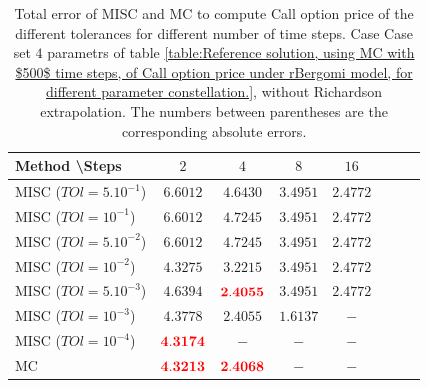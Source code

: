 \documentclass[11pt]{article}
\begin{document}
\begin{table}[h!]
\centering
\begin{tabular}{l*{6}{c}r}
Method \textbackslash  Steps            & $2$ & $4$ & $8$ & $16$  \\
\hline
MISC ($TOl=5.10^{-1}$)  & $\mathbf{6.6012}$ & $\mathbf{ 4.6430}$ & $\mathbf{3.4951}$ & $\mathbf{ 2.4772}$  \\
MISC ($TOl=10^{-1}$)  & $\mathbf{6.6012}$ & $\mathbf{ 4.7245}$& $\mathbf{3.4951}$ & $\mathbf{ 2.4772}$ \\
MISC ($TOl=5.10^{-2}$)  &$\mathbf{6.6012}$& $\mathbf{ 4.7245}$& $\mathbf{3.4951}$ & $\mathbf{ 2.4772}$ \\
MISC ($TOl=10^{-2}$)  & $\mathbf{ 4.3275}$ & $\mathbf{ 3.2215}$ & $\mathbf{3.4951}$ & $\mathbf{ 2.4772}$  \\
MISC ($TOl=5.10^{-3}$)  & $\mathbf{ 4.6394}$ & $\mathbf{{\color{red}2.4055}}$ & $\mathbf{3.4951}$ & $\mathbf{ 2.4772}$  \\

MISC ($TOl=10^{-3}$)  & $\mathbf{ 4.3778}$ & $\mathbf{2.4055}$ & $\mathbf{1.6137}$ & $-$ \\
MISC ($TOl=10^{-4}$)  & $\mathbf{ {\color{red}4.3174}}$ & $-$ &$-$ & $\mathbf{ -}$  \\
\hline
MC     & $\mathbf{ {\color{red}4.3213}}$  & $\mathbf{{\color{red}2.4068}	}$  & $\mathbf{
	-
}$ & $\mathbf{  -	}$  \\			
%		
\hline
\end{tabular}
\caption{Total error of MISC and MC to compute Call option price of the different tolerances for different number of time steps. Case Case set $4$ parametrs of table \ref{table:Reference solution, using MC with $500$ time steps, of Call option price under rBergomi model, for different parameter constellation.}, without Richardson extrapolation. The numbers between parentheses are the corresponding absolute errors.}
\label{Total error of MISC and MC to compute Call option price of the different tolerances for different number of time steps. Case set 4, without Richardson extrapolation. The numbers between parentheses are the corresponding absolute errors.}
\end{table}
\end{document}
